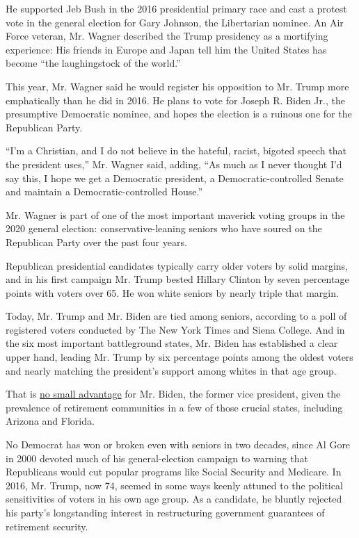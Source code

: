 He supported Jeb Bush in the 2016 presidential primary race and cast a
protest vote in the general election for Gary Johnson, the Libertarian
nominee. An Air Force veteran, Mr. Wagner described the Trump presidency
as a mortifying experience: His friends in Europe and Japan tell him the
United States has become ``the laughingstock of the world.''

This year, Mr. Wagner said he would register his opposition to Mr. Trump
more emphatically than he did in 2016. He plans to vote for Joseph R.
Biden Jr., the presumptive Democratic nominee, and hopes the election is
a ruinous one for the Republican Party.

``I'm a Christian, and I do not believe in the hateful, racist, bigoted
speech that the president uses,'' Mr. Wagner said, adding, ``As much as
I never thought I'd say this, I hope we get a Democratic president, a
Democratic-controlled Senate and maintain a Democratic-controlled
House.''

Mr. Wagner is part of one of the most important maverick voting groups
in the 2020 general election: conservative-leaning seniors who have
soured on the Republican Party over the past four years.

Republican presidential candidates typically carry older voters by solid
margins, and in his first campaign Mr. Trump bested Hillary Clinton by
seven percentage points with voters over 65. He won white seniors by
nearly triple that margin.

Today, Mr. Trump and Mr. Biden are tied among seniors, according to a
poll of registered voters conducted by The New York Times and Siena
College. And in the six most important battleground states, Mr. Biden
has established a clear upper hand, leading Mr. Trump by six percentage
points among the oldest voters and nearly matching the president's
support among whites in that age group.

That is
\href{https://www.nytimes3xbfgragh.onion/2020/03/27/us/politics/biden-trump-seniors.html}{no
small advantage} for Mr. Biden, the former vice president, given the
prevalence of retirement communities in a few of those crucial states,
including Arizona and Florida.

No Democrat has won or broken even with seniors in two decades, since Al
Gore in 2000 devoted much of his general-election campaign to warning
that Republicans would cut popular programs like Social Security and
Medicare. In 2016, Mr. Trump, now 74, seemed in some ways keenly attuned
to the political sensitivities of voters in his own age group. As a
candidate, he bluntly rejected his party's longstanding interest in
restructuring government guarantees of retirement security.

